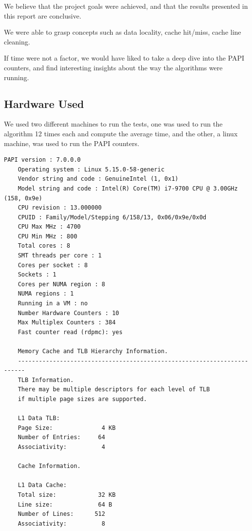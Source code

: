 \documentclass[10pt, titlepage]{extarticle}
\begin{document}
We believe that the project goals were achieved, and that the results presented in this report are conclusive.

We were able to grasp concepts such as data locality, cache hit/miss, cache line cleaning.

If time were not a factor, we would have liked to take a deep dive into the PAPI counters, and find interesting insights about the way the algorithms were running.

\quad


\clearpage
{}

\begin{appendices}

    \section{Hardware Used}\label{Hardware Used}

    We used two different machines to run the tests, one was used to run the algorithm 12 times each and
    compute the average time, and the other, a linux machine, was used to run the PAPI counters.

    \begin{lstlisting}[caption={Linux Machine System Information},label={lst:sys_info}, style=myStyle]
    PAPI version : 7.0.0.0
    Operating system : Linux 5.15.0-58-generic
    Vendor string and code : GenuineIntel (1, 0x1)
    Model string and code : Intel(R) Core(TM) i7-9700 CPU @ 3.00GHz (158, 0x9e)
    CPU revision : 13.000000
    CPUID : Family/Model/Stepping 6/158/13, 0x06/0x9e/0x0d
    CPU Max MHz : 4700
    CPU Min MHz : 800
    Total cores : 8
    SMT threads per core : 1
    Cores per socket : 8
    Sockets : 1
    Cores per NUMA region : 8
    NUMA regions : 1
    Running in a VM : no
    Number Hardware Counters : 10
    Max Multiplex Counters : 384
    Fast counter read (rdpmc): yes

    Memory Cache and TLB Hierarchy Information.
    ------------------------------------------------------------------------
    TLB Information.
    There may be multiple descriptors for each level of TLB
    if multiple page sizes are supported.

    L1 Data TLB:
    Page Size:              4 KB
    Number of Entries:     64
    Associativity:          4

    Cache Information.

    L1 Data Cache:
    Total size:            32 KB
    Line size:             64 B
    Number of Lines:      512
    Associativity:          8


\end{lstlisting}
\end{appendices}
\end{document}
